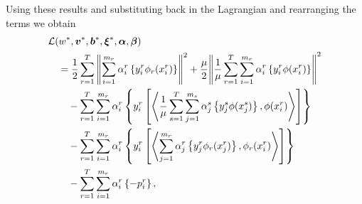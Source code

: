 Using these results and substituting back in the Lagrangian and rearranging the terms we obtain
\begin{equation}\nonumber
    \begin{aligned}
        &  \mathcal{L}({{w}}^*, {\bm{v}}^*, {\bm{b}}^*, {\bm{\xi}}^*, \bm{\alpha}, \bm{\beta}) \\
        &\quad =  \frac{1}{2} \sum_{r= 1}^T{\left\lVert\sum_{i=1}^{m_r} {\alpha_i^r} \left\lbrace y_i^r \phi_r({x}_i^r) \right\rbrace\right\rVert^2} + \frac{\mu}{2} {\left\lVert \frac{1}{\mu}\sum_{r= 1}^T \sum_{i=1}^{m_r} {\alpha_i^r} \left\lbrace y_i^r \phi({x}_i^r) \right\rbrace\right\rVert}^2 \\
        &\qquad -  \sum_{r= 1}^T \sum_{i=1}^{m_r} \alpha_i^r \left\lbrace y_{i}^r \left[ \bm{\left\langle} \frac{1}{\mu} \sum_{s= 1}^T \sum_{j=1}^{m_s} {\alpha_j^s} \left\lbrace y_j^s \phi({x}_j^s) \right\rbrace , \phi({x}_{i}^r) \bm{\right\rangle} \right]  \right\rbrace \\
        &\qquad -  \sum_{r= 1}^T \sum_{i=1}^{m_r} \alpha_i^r \left\lbrace y_{i}^r \left[  \bm{\left\langle} \sum_{j=1}^{m_r} {\alpha_j^r} \left\lbrace y_j^r \phi_r({x}_j^r) \right\rbrace, \phi_r({x}_{i}^r) \bm{\right\rangle}  \right]  \right\rbrace \\
        &\qquad -  \sum_{r= 1}^T \sum_{i=1}^{m_r} \alpha_i^r \left\lbrace - p_{i}^r  \right\rbrace ,
    \end{aligned}
\end{equation}
